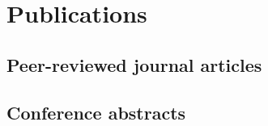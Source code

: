 \documentclass[12pt,a4paper,sans]{moderncv}   %
\begin{document}
\section{Publications}
% 
\subsection{Peer-reviewed journal articles}

\subsection{Conference abstracts}

\end{document}
